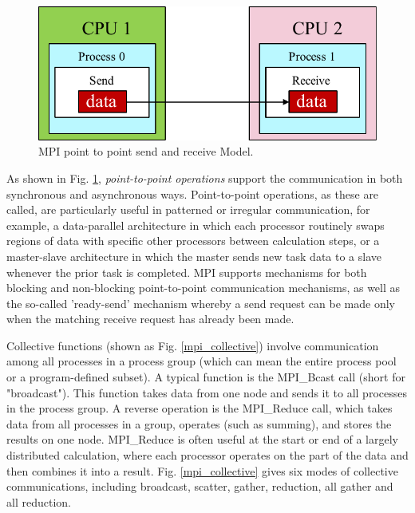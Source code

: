 \begin{figure}[htbp]
	\centering
	\includegraphics[width=0.72\linewidth]{fig/point-point.pdf}
	\caption{MPI point to point send and receive Model.}
	\label{mpi_model}
\end{figure}

As shown in Fig. \ref{mpi_model}, \textit{point-to-point operations} support the communication in both synchronous and asynchronous ways. Point-to-point operations, as these are called, are particularly useful in patterned or irregular communication, for example, a data-parallel architecture in which each processor routinely swaps regions of data with specific other processors between calculation steps, or a master-slave architecture in which the master sends new task data to a slave whenever the prior task is completed. MPI supports mechanisms for both blocking and non-blocking point-to-point communication mechanisms, as well as the so-called 'ready-send' mechanism whereby a send request can be made only when the matching receive request has already been made.

Collective functions (shown as Fig. \ref{mpi_collective}) involve communication among all processes in a process group (which can mean the entire process pool or a program-defined subset). A typical function is the MPI\_Bcast call (short for "broadcast"). This function takes data from one node and sends it to all processes in the process group. A reverse operation is the MPI\_Reduce call, which takes data from all processes in a group, operates (such as summing), and stores the results on one node. MPI\_Reduce is often useful at the start or end of a largely distributed calculation, where each processor operates on the part of the data and then combines it into a result. Fig. \ref{mpi_collective} gives six modes of collective communications, including broadcast, scatter, gather, reduction, all gather and all reduction.

